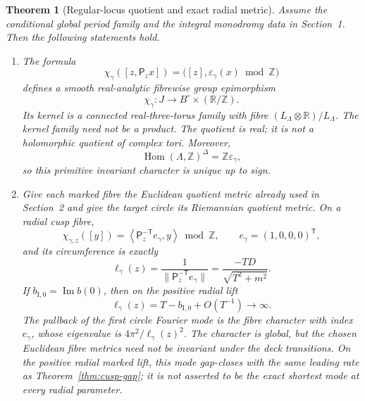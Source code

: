\documentclass[11pt]{article}
\numberwithin{equation}{section}
\newtheorem{theorem}{Theorem}[section]
\theoremstyle{definition}
\theoremstyle{remark}
\newcommand{\R}{\mathbb R}
\newcommand{\Z}{\mathbb Z}
\begin{document}
\begin{theorem}[Regular-locus quotient and exact radial metric]
\label{thm:global-real-quotient}
Assume the conditional global period family and the integral monodromy data
in Section~1.  Then the following statements hold.

\begin{enumerate}[label=(\roman*),leftmargin=2.3em]
\item The formula
\begin{equation}\label{eq:global-circle-map}
 \chi_\gamma([z,\mathsf P_zx])
 =\bigl([z],\varepsilon_\gamma(x)\bmod\Z\bigr)
\end{equation}
defines a smooth real-analytic fibrewise group epimorphism
\begin{equation}\label{eq:global-circle-quotient}
 \chi_\gamma:J\longrightarrow B^\circ\times(\R/\Z).
\end{equation}
Its kernel is a connected real-three-torus family with fibre
$(L_\Lambda\otimes\R)/L_\Lambda$.  The kernel family need not be a product.
The quotient is real; it is not a holomorphic quotient of complex tori.
Moreover,
\begin{equation}\label{eq:invariant-character-lattice}
 \operatorname{Hom}(\Lambda,\Z)^\Delta=\Z\varepsilon_\gamma,
\end{equation}
so this primitive invariant character is unique up to sign.

\item Give each marked fibre the Euclidean quotient metric already used in
Section~2 and give the target circle its Riemannian quotient metric.  On a
radial cusp fibre,
\begin{equation}\label{eq:radial-circle-character}
 \chi_{\gamma,z}([y])
 =\left\langle\mathsf P_z^{-\mathsf T}e_\gamma,y\right\rangle\bmod\Z,
 \qquad e_\gamma=(1,0,0,0)^{\mathsf T},
\end{equation}
and its circumference is exactly
\begin{equation}\label{eq:circle-circumference}
 \ell_\gamma(z)
 =\frac{1}{\lVert\mathsf P_z^{-\mathsf T}e_\gamma\rVert}
 =\frac{-TD}{\sqrt{T^2+m^2}}.
\end{equation}
If $b_{\mathrm I,0}=\operatorname{Im}b(0)$, then on the positive radial lift
\begin{equation}\label{eq:circle-circumference-asymptotic}
 \ell_\gamma(z)=T-b_{\mathrm I,0}+O(T^{-1})\longrightarrow\infty.
\end{equation}
The pullback of the first circle Fourier mode is the fibre character with
index $e_\gamma$, whose eigenvalue is $4\pi^2/\ell_\gamma(z)^2$.  The
character is global, but the chosen Euclidean fibre metrics need not be
invariant under the deck transitions.  On the positive radial marked lift,
this mode gap-closes with the same leading rate as
Theorem~\ref{thm:cusp-gap}; it is not asserted to be the exact shortest mode
at every radial parameter.


\end{enumerate}
\end{theorem}
\end{document}
